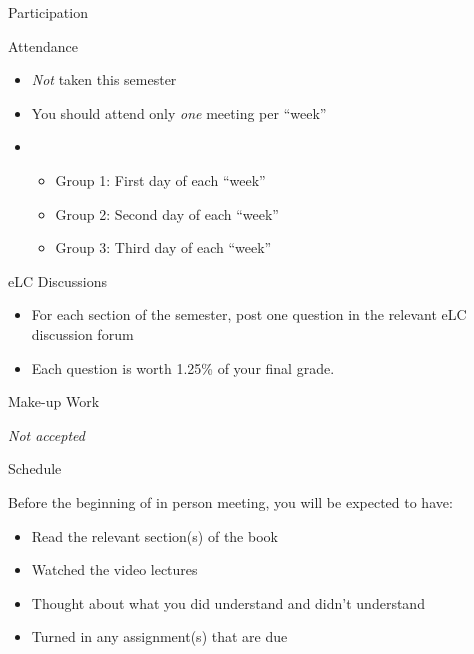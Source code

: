 \documentclass{beamer}
\begin{document}
    \begin{frame}{Participation}
      \begin{block}{Attendance}
        \begin{itemize}
          \item \emph{Not} taken this semester
          \item You should attend only \emph{one} meeting per ``week''
          \item
          \begin{itemize}
            \item Group 1: First day of each ``week''
            \item Group 2: Second day of each ``week''
            \item Group 3: Third day of each ``week''
          \end{itemize}
        \end{itemize}
      \end{block}
      \begin{block}{eLC Discussions}
        \begin{itemize}
          \item For each section of the semester, post one question in the relevant eLC discussion forum
          \item Each question is worth 1.25\% of your final grade.
        \end{itemize}
      \end{block}
    \end{frame}

    \begin{frame}{Make-up Work}
      \begin{block}{}
        \emph{Not accepted}
      \end{block}
    \end{frame}

    \begin{frame}{Schedule}
      \begin{block}{}
        Before the beginning of in person meeting, you will be expected to have:
        \begin{itemize}
          \item Read the relevant section(s) of the book
          \item Watched the video lectures
          \item Thought about what you did understand and didn't understand
          \item Turned in any assignment(s) that are due
        \end{itemize}
      \end{block}
    \end{frame}
\end{document}
